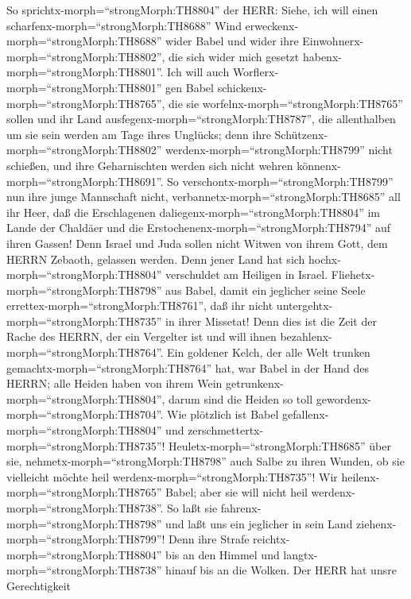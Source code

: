  So sprichtx-morph=``strongMorph:TH8804'' der HERR: Siehe,
ich will einen scharfenx-morph=``strongMorph:TH8688'' Wind
erweckenx-morph=``strongMorph:TH8688'' wider Babel und wider ihre
Einwohnerx-morph=``strongMorph:TH8802'', die sich wider mich gesetzt
habenx-morph=``strongMorph:TH8801''.  Ich will auch
Worflerx-morph=``strongMorph:TH8801'' gen Babel
schickenx-morph=``strongMorph:TH8765'', die sie
worfelnx-morph=``strongMorph:TH8765'' sollen und ihr Land
ausfegenx-morph=``strongMorph:TH8787'', die allenthalben um sie sein
werden am Tage ihres Unglücks;  denn ihre
Schützenx-morph=``strongMorph:TH8802''
werdenx-morph=``strongMorph:TH8799'' nicht schießen, und ihre
Geharnischten werden sich nicht wehren
könnenx-morph=``strongMorph:TH8691''. So
verschontx-morph=``strongMorph:TH8799'' nun ihre junge Mannschaft nicht,
verbannetx-morph=``strongMorph:TH8685'' all ihr Heer,  daß
die Erschlagenen daliegenx-morph=``strongMorph:TH8804'' im Lande der
Chaldäer und die Erstochenenx-morph=``strongMorph:TH8794'' auf ihren
Gassen!  Denn Israel und Juda sollen nicht Witwen von ihrem
Gott, dem HERRN Zebaoth, gelassen werden. Denn jener Land hat sich
hochx-morph=``strongMorph:TH8804'' verschuldet am Heiligen in Israel.
 Fliehetx-morph=``strongMorph:TH8798'' aus Babel, damit ein
jeglicher seine Seele errettex-morph=``strongMorph:TH8761'', daß ihr
nicht untergehtx-morph=``strongMorph:TH8735'' in ihrer Missetat! Denn
dies ist die Zeit der Rache des HERRN, der ein Vergelter ist und will
ihnen bezahlenx-morph=``strongMorph:TH8764''.  Ein goldener
Kelch, der alle Welt trunken gemachtx-morph=``strongMorph:TH8764'' hat,
war Babel in der Hand des HERRN; alle Heiden haben von ihrem Wein
getrunkenx-morph=``strongMorph:TH8804'', darum sind die Heiden so toll
gewordenx-morph=``strongMorph:TH8704''.  Wie plötzlich ist
Babel gefallenx-morph=``strongMorph:TH8804'' und
zerschmettertx-morph=``strongMorph:TH8735''!
Heuletx-morph=``strongMorph:TH8685'' über sie,
nehmetx-morph=``strongMorph:TH8798'' auch Salbe zu ihren Wunden, ob sie
vielleicht möchte heil werdenx-morph=``strongMorph:TH8735''!
 Wir heilenx-morph=``strongMorph:TH8765'' Babel; aber sie
will nicht heil werdenx-morph=``strongMorph:TH8738''. So laßt sie
fahrenx-morph=``strongMorph:TH8798'' und laßt uns ein jeglicher in sein
Land ziehenx-morph=``strongMorph:TH8799''! Denn ihre Strafe
reichtx-morph=``strongMorph:TH8804'' bis an den Himmel und
langtx-morph=``strongMorph:TH8738'' hinauf bis an die Wolken.
 Der HERR hat unsre Gerechtigkeit
